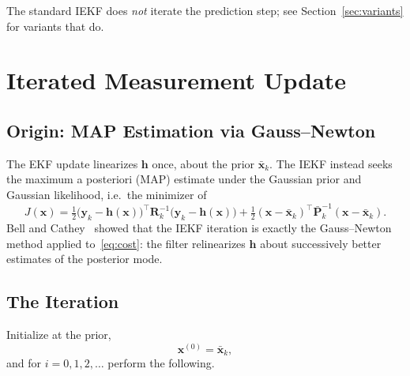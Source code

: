 \documentclass[11pt]{article}
\newcommand{\x}{\bm{x}}
\newcommand{\y}{\bm{y}}
\newcommand{\meas}{\bm{h}}
\newcommand{\Pm}{\bm{P}}
\newcommand{\R}{\bm{R}}
\newcommand{\xbar}{\bar{\x}}
\newcommand{\Pbar}{\bar{\Pm}}
\newcommand{\iter}[1]{^{(#1)}}
\begin{document}
The standard IEKF does \emph{not} iterate the prediction step; see
Section~\ref{sec:variants} for variants that do.

\section{Iterated Measurement Update}

\subsection{Origin: MAP Estimation via Gauss--Newton}

The EKF update linearizes $\meas$ once, about the prior $\xbar_k$. The IEKF instead seeks the
maximum a posteriori (MAP) estimate under the Gaussian prior and Gaussian likelihood, i.e.\ the
minimizer of
\begin{equation}
  J(\x) = \tfrac{1}{2}\bigl(\y_k - \meas(\x)\bigr)^\top \R_k^{-1}\bigl(\y_k - \meas(\x)\bigr)
        + \tfrac{1}{2}(\x - \xbar_k)^\top \Pbar_k^{-1}(\x - \xbar_k).
  \label{eq:cost}
\end{equation}
Bell and Cathey~\cite{bell1993} showed that the IEKF iteration is exactly the
Gauss--Newton method applied to~\eqref{eq:cost}: the filter relinearizes $\meas$ about
successively better estimates of the posterior mode.

\subsection{The Iteration}

Initialize at the prior,
\begin{equation}
  \x\iter{0} = \xbar_k ,
\end{equation}
and for $i = 0, 1, 2, \dots$ perform the following.
\end{document}
